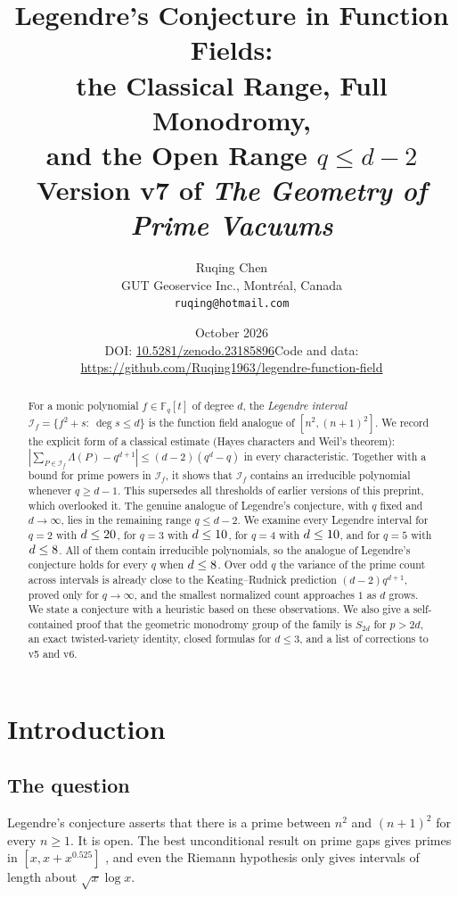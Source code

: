 \documentclass[11pt,a4paper]{article}
\title{\textbf{Legendre's Conjecture in Function Fields:\\
the Classical Range, Full Monodromy,\\ and the Open Range $q\le d-2$}\\[4pt]
\large Version v7 of \textit{The Geometry of Prime Vacuums}}
\author{Ruqing Chen\\[3pt]
\small GUT Geoservice Inc., Montr\'eal, Canada\\
\small \texttt{ruqing@hotmail.com}}
\date{October 2026\\[2pt]\small DOI: \href{https://doi.org/10.5281/zenodo.23185896}{10.5281/zenodo.23185896}\quad Code and data: \url{https://github.com/Ruqing1963/legendre-function-field}}
\theoremstyle{definition}
\theoremstyle{remark}
\newcommand{\Fq}{\mathbb{F}_q}
\newcommand{\cI}{\mathcal{I}}
\begin{document}
\maketitle

\begin{abstract}
For a monic polynomial $f\in\Fq[t]$ of degree $d$, the \emph{Legendre interval}
$\cI_f=\{f^2+s:\ \deg s\le d\}$ is the function field analogue of $[n^2,(n+1)^2]$.
We record the explicit form of a classical estimate (Hayes characters and Weil's theorem):
$|\sum_{P\in\cI_f}\Lambda(P)-q^{d+1}|\le(d-2)(q^d-q)$ in every characteristic.
Together with a bound for prime powers in $\cI_f$, it shows that $\cI_f$ contains an
irreducible polynomial whenever $q\ge d-1$. This supersedes all thresholds of earlier versions
of this preprint, which overlooked it. The genuine analogue of Legendre's conjecture, with $q$
fixed and $d\to\infty$, lies in the remaining range $q\le d-2$.
We examine every Legendre interval for $q=2$ with $d\le20$, for $q=3$ with $d\le10$,
for $q=4$ with $d\le10$, and for $q=5$ with $d\le8$. All of them contain
irreducible polynomials, so the analogue of Legendre's conjecture holds for every $q$ when
$d\le8$. Over odd $q$ the variance of the prime count across intervals is already close
to the Keating--Rudnick prediction $(d-2)q^{d+1}$, proved only for $q\to\infty$, and the
smallest normalized count approaches $1$ as $d$ grows. We state a conjecture with a heuristic
based on these observations. We also give a self-contained proof that the geometric monodromy
group of the family is $S_{2d}$ for $p>2d$, an exact twisted-variety identity, closed formulas
for $d\le3$, and a list of corrections to v5 and v6.
\end{abstract}

\tableofcontents
\bigskip

\section{Introduction}\label{sec:intro}

\subsection{The question}
Legendre's conjecture asserts that there is a prime between $n^2$ and $(n+1)^2$ for every
$n\ge1$. It is open. The best unconditional result on prime gaps gives primes in
$[x,x+x^{0.525}]$ \cite{BHP2001}, and even the Riemann hypothesis only gives intervals of
length about $\sqrt x\log x$.
\end{document}
